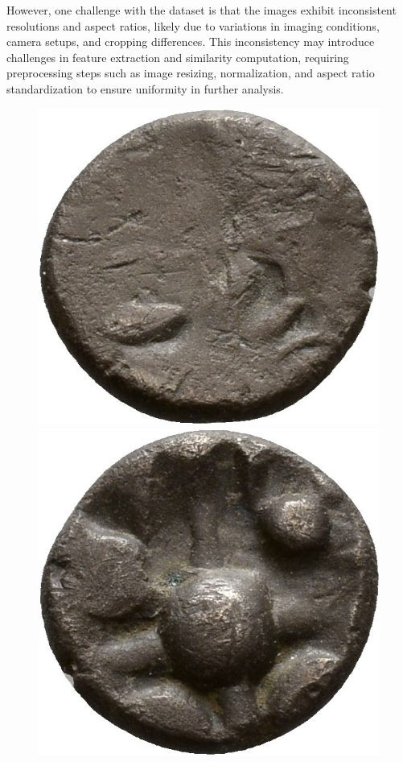 \documentclass[nolibertine, english, algorithm, nomencl, minted]{ttlab-qualify}
\begin{document}
However, one challenge with the dataset is that the images exhibit inconsistent resolutions and aspect ratios, 
likely due to variations in imaging conditions, camera setups, and cropping differences. This inconsistency may 
introduce challenges in feature extraction and similarity computation, requiring preprocessing steps such as image 
resizing, normalization, and aspect ratio standardization to ensure uniformity in further analysis.



\begin{figure}[h]
    \centering
    \begin{minipage}{0.25\textwidth}
        \centering
        \includegraphics[width=\linewidth]{static/00012a00.jpg}
    \end{minipage}
    \hfill
    \begin{minipage}{0.25\textwidth}
        \centering
        \includegraphics[width=\linewidth]{static/00012r00.jpg}

\end{minipage}
\end{figure}
\end{document}
